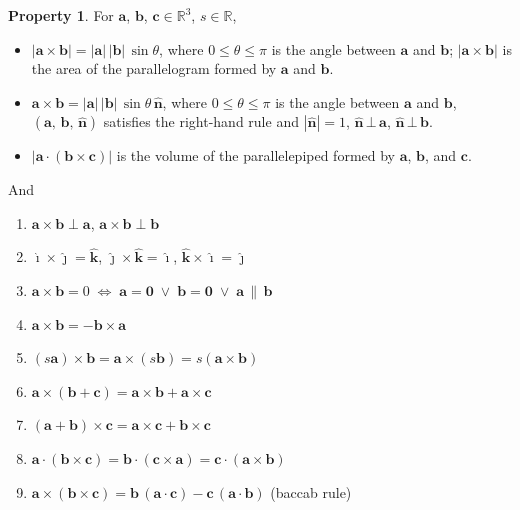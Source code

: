 \documentclass[12pt]{extarticle}
\newcommand{\ifff}{\;\Longleftrightarrow\;}
\theoremstyle{definition}
\newtheorem*{prp}{Property}
\newcommand{\va}{\mathbf{a}}
\newcommand{\vb}{\mathbf{b}}
\newcommand{\vc}{\mathbf{c}}
\newcommand{\vZero}{\mathbf{0}}
\newcommand{\hi}{\widehat{\pmb{\imath}}}
\newcommand{\hj}{\widehat{\pmb{\jmath}}}
\newcommand{\hk}{\widehat{\mathbf{k}}}
\newcommand{\hn}{\widehat{\mathbf{n}}}
\begin{document}
\begin{prp} For $\va$, $\vb$, $\vc\in\mathbb{R}^3$, $s\in\mathbb{R}$,
  \begin{itemize}\setlength{\itemsep}{0pt}
    \item $|\va\times\vb| = |\va|\,|\vb|\,\sin\theta$, where $0\leqslant\theta\leqslant\pi$ is the angle between $\va$ and $\vb$; $|\va\times\vb|$ is the area of the parallelogram formed by $\va$ and $\vb$. 
    \item $\va\times\vb = |\va|\,|\vb|\,\sin\theta\,\hn$, where $0\leqslant\theta\leqslant\pi$ is the angle between $\va$ and $\vb$, $(\va,\,\vb,\,\hn)$ satisfies the right-hand rule and $|\hn| = 1$, $\hn\,\bot\,\va$, $\hn\,\bot\,\vb$.  
    \item $|\va\cdot(\vb\times\vc)|$ is the volume of the parallelepiped formed by $\va$, $\vb$, and $\vc$. 
  \end{itemize}
  And
  \setlength{\columnsep}{-20mm}
  \begin{multicols}{2}
    \begin{enumerate}\setlength{\itemsep}{0pt}
      \item $\va\times\vb\;\bot\;\va$, $\va\times\vb\;\bot\;\vb$ 
      \item $\hi\times\hj = \hk$, $\hj\times\hk = \hi$, $\hk\times\hi = \hj$
      \item $\va\times\vb = 0\ifff \va=\vZero\;\vee\;\vb = \vZero\;\vee\;\va\,\parallel\,\vb$
      \item $\va\times\vb = -\vb\times\va$
      \item $(s\va)\times\vb = \va\times(s\vb) = s(\va\times\vb)$
      \item $\va\times(\vb + \vc) = \va\times\vb + \va\times\vc$
      \item $(\va + \vb)\times\vc = \va\times\vc + \vb\times\vc$
      \item $\va\cdot(\vb\times\vc) = \vb\cdot(\vc\times\va) = \vc\cdot(\va\times\vb)$
      \item $\va\times(\vb\times\vc) = \vb\,(\va\cdot\vc) - \vc\,(\va\cdot\vb)$ (baccab rule)  
    \end{enumerate}
  \end{multicols}
\end{prp}
\end{document}
